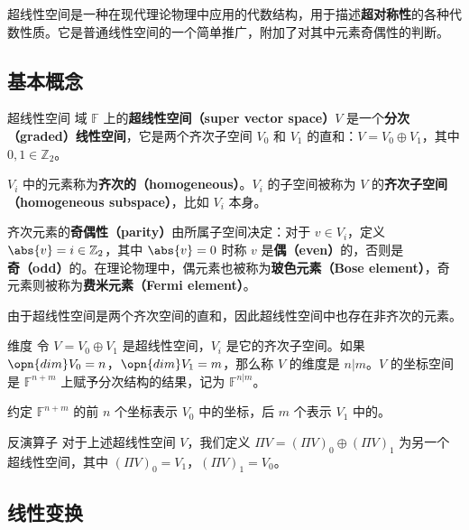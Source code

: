 


超线性空间是一种在现代理论物理中应用的代数结构，用于描述\textbf{超对称性}的各种代数性质。它是普通线性空间的一个简单推广，附加了对其中元素奇偶性的判断。

\subsection{基本概念}

\begin{definition}{超线性空间}
域 $\mathbb{F}$ 上的\textbf{超线性空间（super vector space）}$V$ 是一个\textbf{分次（graded）线性空间}，它是两个齐次子空间 $V_0$ 和 $V_1$ 的直和：$V=V_0\oplus V_1$，其中 $0, 1\in \mathbb{Z}_2$。
\end{definition}


$V_i$ 中的元素称为\textbf{齐次的（homogeneous）}。$V_i$ 的子空间被称为 $V$ 的\textbf{齐次子空间（homogeneous subspace）}，比如 $V_i$ 本身。

齐次元素的\textbf{奇偶性（parity）}由所属子空间决定：对于 $v\in V_i$，定义 $\abs{v}=i\in\mathbb{Z}_2$，其中 $\abs{v}=0$ 时称 $v$ 是\textbf{偶（even）}的，否则是\textbf{奇（odd）}的。在理论物理中，偶元素也被称为\textbf{玻色元素（Bose element）}，奇元素则被称为\textbf{费米元素（Fermi element）}。

由于超线性空间是两个齐次空间的直和，因此超线性空间中也存在非齐次的元素。

\begin{definition}{维度}
令 $V=V_0\oplus V_1$ 是超线性空间，$V_i$ 是它的齐次子空间。如果 $\opn{dim}V_0=n$，$\opn{dim}V_1=m$，那么称 $V$ 的维度是 $n|m$。$V$ 的坐标空间是 $\mathbb{F}^{n+m}$ 上赋予分次结构的结果，记为 $\mathbb{F}^{n|m}$。

约定 $\mathbb{F}^{n+m}$ 的前 $n$ 个坐标表示 $V_0$ 中的坐标，后 $m$ 个表示 $V_1$ 中的。
\end{definition}

\begin{definition}{反演算子}
对于上述超线性空间 $V$，我们定义 $\Pi V=(\Pi V)_0\oplus(\Pi V)_1$ 为另一个超线性空间，其中 $(\Pi V)_0=V_1$，$(\Pi V)_1=V_0$。
\end{definition}


\subsection{线性变换}

